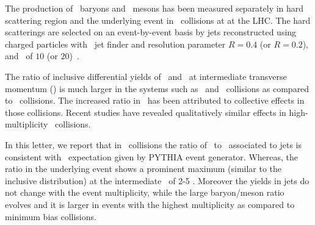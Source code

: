 The production of \lda\ baryons and \ks\ mesons has been measured separately in hard scattering region and the underlying event in \pPb\ collisions at  at the LHC.
The hard scatterings are selected on an event-by-event basis by jets reconstructed using charged particles with \akT\ jet finder and resolution parameter $R=0.4$ (or $R=0.2$), and \ptjet\ of $10$ (or $20$)~\gevc.

The ratio of inclusive differential yields of \lda\ and \ks\ at intermediate transverse momentum (\pt) is much larger in the systems such as \PbPb\ and \pPb\ collisions as compared to \pp\ collisions. The increased ratio in \PbPb\ has been attributed to collective effects in those collisions. Recent studies have revealed qualitatively similar effects in high-multiplicity \pPb\ collisions.

In this letter, we report that in \pPb\ collisions the ratio of \lda\ to \ks\ associated to jets is consistent with \pp\ expectation given by PYTHIA event generator. Whereas, the ratio in the underlying event shows a prominent maximum (similar to the inclusive distribution) at the intermediate \pt\ of 2-5 \gevc. Moreover the yields in jets do not change with the event multiplicity, while the large baryon/meson ratio evolves and it is larger in events with the highest multiplicity as compared to minimum bias collisions.


